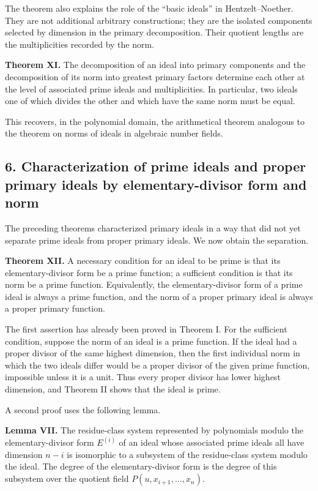 \documentclass[11pt]{article}
\begin{document}
The theorem also explains the role of the ``basic ideals'' in Hentzelt--Noether. They are not additional arbitrary constructions; they are the isolated components selected by dimension in the primary decomposition. Their quotient lengths are the multiplicities recorded by the norm.

\textbf{Theorem XI.} The decomposition of an ideal into primary components and the decomposition of its norm into greatest primary factors determine each other at the level of associated prime ideals and multiplicities. In particular, two ideals one of which divides the other and which have the same norm must be equal.

This recovers, in the polynomial domain, the arithmetical theorem analogous to the theorem on norms of ideals in algebraic number fields.

\subsection{6. Characterization of prime ideals and proper primary ideals by elementary-divisor form and norm}

The preceding theorems characterized primary ideals in a way that did not yet separate prime ideals from proper primary ideals. We now obtain the separation.

\textbf{Theorem XII.} A necessary condition for an ideal to be prime is that its elementary-divisor form be a prime function; a sufficient condition is that its norm be a prime function. Equivalently, the elementary-divisor form of a prime ideal is always a prime function, and the norm of a proper primary ideal is always a proper primary function.

The first assertion has already been proved in Theorem I. For the sufficient condition, suppose the norm of an ideal is a prime function. If the ideal had a proper divisor of the same highest dimension, then the first individual norm in which the two ideals differ would be a proper divisor of the given prime function, impossible unless it is a unit. Thus every proper divisor has lower highest dimension, and Theorem II shows that the ideal is prime.

A second proof uses the following lemma.

\textbf{Lemma VII.} The residue-class system represented by polynomials modulo the elementary-divisor form $E^{(i)}$ of an ideal whose associated prime ideals all have dimension $n-i$ is isomorphic to a subsystem of the residue-class system modulo the ideal. The degree of the elementary-divisor form is the degree of this subsystem over the quotient field $P(u,x_{i+1},\ldots,x_n)$.
\end{document}
